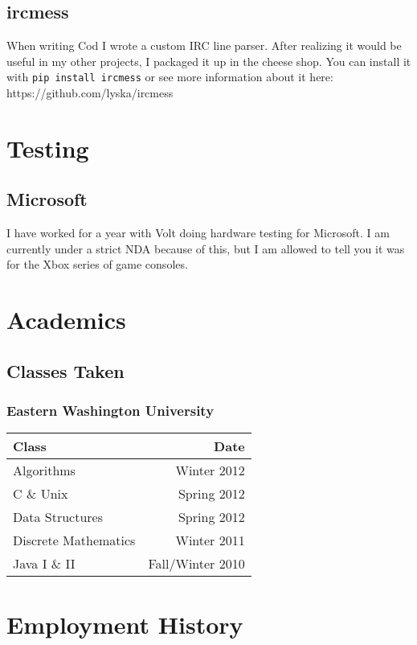\documentclass[twocolumn]{article}
\begin{document}
\subsection{ircmess}

When writing Cod I wrote a custom IRC line parser. After realizing it would be useful in my other projects, I packaged it up in the cheese shop. You can install it with \texttt{pip install ircmess} or see more information about it here: https://github.com/lyska/ircmess

\section{Testing}

\subsection{Microsoft}

I have worked for a year with Volt doing hardware testing for Microsoft. I am currently under a strict NDA because of this, but I am allowed to tell you it was for the Xbox series of game consoles.

\section{Academics}

\subsection{Classes Taken}

\subsubsection{Eastern Washington University}

\begin{tabular}{| l | r |}
    Class & Date \\
    \hline
    Algorithms & Winter 2012 \\
    C \& Unix & Spring 2012 \\
    Data Structures & Spring 2012 \\
    Discrete Mathematics & Winter 2011 \\
    Java I \& II & Fall/Winter 2010 \\
\end{tabular}

\section{Employment History}
\end{document}
